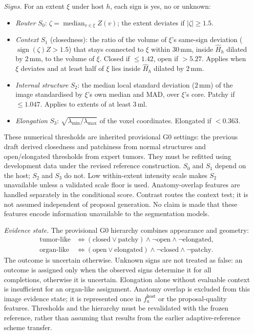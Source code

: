 \documentclass[fleqn,10pt]{olplainarticle}
\begin{document}
\emph{Signs.} For an extent $\xi$ under host $h$, each sign is yes, no or unknown:
\begin{itemize}
\item \emph{Router} $S_0$: $\zeta=\operatorname{median}_{v\in\xi}Z(v)$; the extent deviates if $|\zeta|\ge1.5$.
\item \emph{Context} $S_1$ (closedness): the ratio of the volume of $\xi$'s same-sign deviation ($\operatorname{sign}(\zeta)Z>1.5$)
that stays connected to $\xi$ within $30$\,mm, inside $\hat H_h$ dilated by $2$\,mm, to the volume of $\xi$. Closed if
$\le1.42$, open if $>5.27$. Applies when $\xi$ deviates and at least half of $\xi$ lies inside $\hat H_h$ dilated by $2$\,mm.
\item \emph{Internal structure} $S_2$: the median local standard deviation ($2$\,mm) of the image standardised by $\xi$'s own
median and MAD, over $\xi$'s core. Patchy if $\le1.047$. Applies to extents of at least $3$\,ml.
\item \emph{Elongation} $S_3$: $\sqrt{\lambda_{\min}/\lambda_{\max}}$ of the voxel coordinates. Elongated if $<0.363$.
\end{itemize}
These numerical thresholds are inherited provisional G0 settings: the previous draft derived closedness and patchiness
from normal structures and open/elongated thresholds from expert tumors. They must be refitted using development data
under the revised reference construction. $S_0$ and $S_1$ depend on the host; $S_2$ and $S_3$ do not. Low within-extent
intensity scale makes $S_2$ unavailable unless a validated scale floor is used. Anatomy-overlap features are handled
separately in the conditional score. Contrast routes the context test; it is not assumed independent of proposal generation.
No claim is made that these features encode information unavailable to the segmentation models.

\emph{Evidence state.}
The provisional G0 hierarchy combines appearance and geometry:
\begin{equation}
\label{eq:tree}
\begin{aligned}
\text{tumor-like}&\iff(\text{closed}\vee\text{patchy})\wedge\neg\text{open}\wedge\neg\text{elongated},\\
\text{organ-like}&\iff(\text{open}\vee\text{elongated})\wedge\neg\text{closed}\wedge\neg\text{patchy}.
\end{aligned}
\end{equation}
The outcome is uncertain otherwise. Unknown signs are not treated as false: an outcome is assigned only when the observed
signs determine it for all completions, otherwise it is uncertain. Elongation alone without evaluable context is insufficient
for an organ-like assignment. Anatomy overlap is excluded from this image evidence state; it is represented once in
$f_a^{\mathrm{host}}$ or the proposal-quality features. Thresholds and the hierarchy must be revalidated with the frozen
reference, rather than assuming that results from the earlier adaptive-reference scheme transfer.
\end{document}
